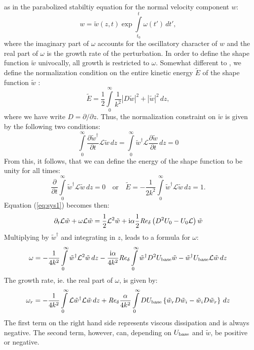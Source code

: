 \documentclass{jfm}
\newcommand\be{\begin{equation}}
\newcommand\ee{\end{equation}}
\newcommand\base{{\rm base}}
\newcommand\Rey{\mbox{\textit{Re}}}  %
\begin{document}
as in the parabolized stabiltiy equation \citep{BertolottiHerbertSpalart1992} for the normal velocity component $ w $:
\be
w = \tilde{w}(z,t) \exp \int \limits_{t_0}^t \omega(t') \, dt', \label{eq:pseDecomposition}
\ee
where the imaginary part of $ \omega $ accounts for
the oscillatory character of $ w $ and the real part
of $ \omega $ is the growth rate of the perturbation.
In order to define the shape function $ \tilde{w} $ univocally, all growth is restricted to $ \omega $. Somewhat different to \citep{BertolottiHerbertSpalart1992},
we define the normalization condition on the entire kinetic energy $ \tilde{E} $ of the shape function $ \tilde{w} $ :
\be
\tilde{E} = \frac{1}{2} \int \limits_0^\infty \frac{1}{k^2} | D\tilde{w} |^2 + | \tilde{w} |^2 \, dz,
\ee
where we have write $ D = \partial/ \partial z $. 
Thus, the normalization constraint on $ \tilde{w} $ is given by the following two conditions:
\be
 \int \limits_0^\infty \frac{\partial \tilde{w}^\dagger }{\partial t}  \mathcal{L} \tilde{w} \, dz
 = \int \limits_0^\infty  \tilde{w}^\dagger \mathcal{L}  \frac{\partial \tilde{w} }{\partial t} \, dz
 = 0 
\ee
From this, it follows, that we can define the energy of the shape function to be unity
for all times:
\be
\frac{\partial }{\partial t} \int \limits_0^\infty \tilde{w}^\dagger  \mathcal{L} \tilde{w} \, dz
=0
\quad \mbox{or} \quad \tilde{E} = 
-\frac{1}{2k^2}\int \limits_0^\infty \tilde{w}^\dagger \mathcal{L} \tilde{w} \, dz =  1.
\ee
Equation (\ref{eq:sys1}) becomes then:
\be
\partial_t \mathcal{L} \tilde{w} + \omega \mathcal{L} \tilde{w}
= \frac{1}{2} \mathcal{L}^2 \tilde{w} + {\rm i} \alpha \frac{1}{2} \Rey_\delta
\left( D^2 U_0 - U_0 \mathcal{L} \right) \tilde{w}
\ee
Multiplying by $ \tilde{w}^\dagger $ and integrating in $ z $, leads to
a formula for $ \omega $:
\be
\omega = -\frac{1}{4 k^2} \int \limits_0^\infty \tilde{w}^\dagger \mathcal{L}^2 \tilde{w} \, dz
- \frac{{\rm i} \alpha }{4 k^2} \Rey_\delta 
\int \limits_0^\infty \tilde{w}^\dagger D^2 U_\base \tilde{w} - \tilde{w}^\dagger U_\base \mathcal{L} \tilde{w} \, dz \label{eq:omegaPSE}
\ee
The growth rate, ie. the real part of $ \omega $, is given by:
\be
\omega_r = - \frac{1}{4 k^2}
\int \limits_0^\infty \mathcal{L} \tilde{w}^\dagger \mathcal{L} \tilde{w}
\, dz  + \Rey_\delta  \frac{\alpha}{4 k^2}
\int \limits_0^\infty D U_\base \left\{ \tilde{w}_r D \tilde{w}_i - \tilde{w}_i D \tilde{w}_r \right\} \, dz \label{eq:growth}
\ee
The first term on the right hand side represents viscous dissipation and is always negative. The
second term, however, can, depending on $ U_\base $ and $ \tilde{w} $, be positive or negative.
\end{document}
